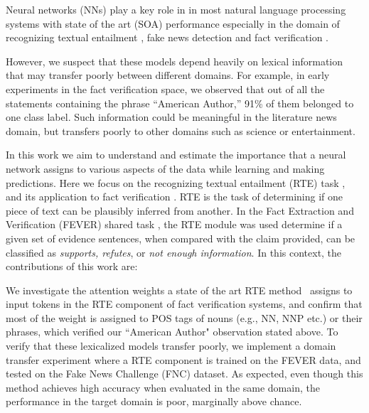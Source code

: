 \documentclass[conference,onecolumn]{IEEEtran}
\begin{document}
Neural networks (NNs)  play a key role in in most natural language processing systems with state of the art (SOA) performance \cite{devlin2018bert, sun2018improving,bohnet2018morphosyntactic} especially in the domain of recognizing textual entailment \cite{kim2018semantic}, fake news detection \cite{baird2017talos} and fact verification \cite{nie2018combining}.

However, we suspect that these models depend heavily on lexical information that may transfer poorly between different domains. For example, in early experiments in the fact verification space, we observed that out of all the statements containing the phrase ``American Author,'' 91\% of them belonged to one class label. Such information could be meaningful in the literature news domain, but transfers poorly to other domains such as science or entertainment. 

In this work we aim to understand and estimate the importance that a neural network assigns to various aspects of the data while learning and making predictions. Here we focus on the recognizing textual entailment (RTE) task \cite{dagan2013recognizing}, and its application to fact verification \cite{thorne2018fever}.
RTE is the task of determining if one piece of text can be plausibly inferred from another. In the Fact Extraction and Verification (FEVER) shared task \cite{thorne2018fever}, the RTE module was used determine if a given set of evidence sentences, when compared with the claim provided, can be classified as \textit{supports, refutes}, or \textit{not enough information}.
In this context, the contributions of this work are:




{\flushleft {}}

{} We investigate the attention weights a state of the art RTE method~\cite{parikh2016decomposable} assigns to input tokens in the RTE component of fact verification systems, and confirm that most of the weight is assigned to POS tags of nouns (e.g., NN, NNP etc.) or their phrases, which verified our ``American Author" observation stated above.
{}  To verify that these lexicalized models transfer poorly, we implement a domain transfer experiment where a RTE component is trained on the FEVER data, and tested on the Fake News Challenge (FNC) \cite{pomerleau2017fake} dataset. As expected, even though this method achieves high accuracy when evaluated in the same domain, the performance in the target domain is poor, marginally above chance.
\end{document}

